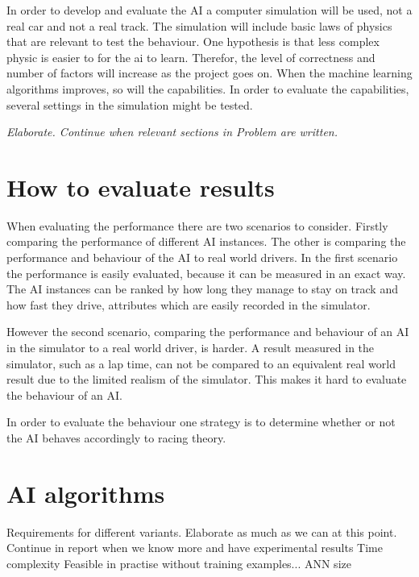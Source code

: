 In order to develop and evaluate the AI a computer simulation will be used, not a real car and not a real track. The simulation will include basic laws of physics that are relevant to test the behaviour. One hypothesis is that less complex physic is easier to for the ai to learn. Therefor, the level of correctness and number of factors will increase as the project goes on. When the machine learning algorithms improves, so will the capabilities. In order to evaluate the capabilities, several settings in the simulation might be tested.

\textit{
    Elaborate. Continue when relevant sections in Problem are written.
}

\section{How to evaluate results}


When evaluating the performance there are two scenarios to consider. Firstly comparing the performance of different AI instances. The other is comparing the performance and behaviour of the AI to real world drivers. In the first scenario the performance is easily evaluated, because it can be measured in an exact way. The AI instances can be ranked by how long they manage to stay on track and how fast they drive, attributes which are easily recorded in the simulator. 

However the second scenario, comparing the performance and behaviour of an AI in the simulator to a real world driver, is harder. A result measured in the simulator, such as a lap time, can not be compared to an equivalent real world result due to the limited realism of the simulator. This makes it hard to evaluate the behaviour of an AI. 

In order to evaluate the behaviour one strategy is to determine whether or not the AI behaves accordingly to racing theory. 


\section{AI algorithms}
    Requirements for different variants. Elaborate as much as we can at this point. Continue in report when we know more and have experimental results
    Time complexity
    Feasible in practise
    without training examples...
    ANN size
    
